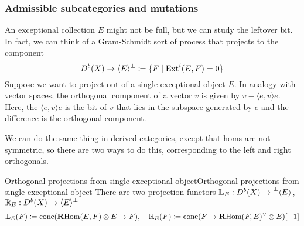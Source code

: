 

\subsubsection{Admissible subcategories and mutations}


An exceptional collection $E$ might not be full, but we can study the leftover bit. In fact, we can think of a Gram-Schmidt sort of process that projects to the component
\begin{equation*}
    D^b(X) \to \langle E\rangle^\perp \coloneqq \{F\mid\operatorname{Ext}^i(E,F)=0\}
\end{equation*}
Suppose we want to project out of a single exceptional object $E$. In analogy with vector spaces, the orthogonal component of a vector $v$ is given by $v-\langle e,v \rangle e$. Here, the $\langle e,v \rangle e$ is the bit of $v$ that lies in the subspace generated by $e$ and the difference is the orthogonal component.

We can do the same thing in derived categories, except that homs are not symmetric, so there are two ways to do this, corresponding to the left and right orthogonals.

\begin{definition}{Orthogonal projections from single exceptional object}{Orthogonal projections from single exceptional object}
    There are two projection functors $\mathbb{L}_E:D^b(X)\to\prescript{\perp}{}{\langle} E\rangle$, $\mathbb{R}_E:D^b(X)\to\langle E\rangle^\perp$
    \begin{equation*}
        \mathbb{L}_E(F) \coloneqq \operatorname{cone}(\operatorname{\mathbf{R} Hom}(E,F)\otimes E \to F), \quad
        \mathbb{R}_E(F) \coloneqq \operatorname{cone}(F\to\operatorname{\mathbf{R} Hom}(F,E)^\lor\otimes E )[-1]
    \end{equation*}
\end{definition}

